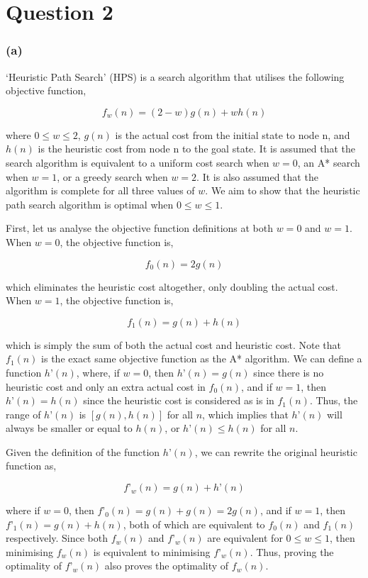 \documentclass{article}
\begin{document}
\section*{Question 2}

\subsubsection*{(a)}
‘Heuristic Path Search’ (HPS) is a search algorithm that utilises the following objective function,

$$f_w(n) = (2 - w)g(n) + wh(n)$$

where $0 \leq w \leq 2$, $g(n)$ is the actual cost from the initial state to node n, and $h(n)$ is the heuristic cost from node n to the goal state. It is assumed that the search algorithm is equivalent to a uniform cost search when $w = 0$, an A* search when $w = 1$, or a greedy search when $w = 2$. It is also assumed that the algorithm is complete for all three values of $w$. We aim to show that the heuristic path search algorithm is optimal when $0 \leq w \leq 1$.

First, let us analyse the objective function definitions at both $w = 0$ and $w = 1$. When $w = 0$, the objective function is,

$$f_0(n) = 2g(n)$$

which eliminates the heuristic cost altogether, only doubling the actual cost. When $w = 1$, the objective function is,

$$f_1(n) = g(n) + h(n)$$

which is simply the sum of both the actual cost and heuristic cost. Note that $f_1(n)$ is the exact same objective function as the A* algorithm. We can define a function $h’(n)$, where, if $w = 0$, then $h’(n) = g(n)$ since there is no heuristic cost and only an extra actual cost in $f_0(n)$, and if $w = 1$, then $h’(n) = h(n)$ since the heuristic cost is considered as is in $f_1(n)$. Thus, the range of $h’(n)$ is $[g(n), h(n)]$ for all $n$, which implies that $h’(n)$ will always be smaller or equal to $h(n)$, or $h’(n) \leq h(n)$ for all $n$.

Given the definition of the function $h’(n)$, we can rewrite the original heuristic function as,

$$f’_w(n) = g(n) + h’(n)$$

where if $w = 0$, then $f’_0(n) = g(n) + g(n) = 2g(n)$, and if $w = 1$, then $f’_1(n) = g(n) + h(n)$, both of which are equivalent to $f_0(n)$ and $f_1(n)$ respectively. Since both $f_w(n)$ and $f’_w(n)$ are equivalent for $0 \leq w \leq 1$, then minimising $f_w(n)$ is equivalent to minimising $f’_w(n)$. Thus, proving the optimality of $f’_w(n)$ also proves the optimality of $f_w(n)$. 
\end{document}
